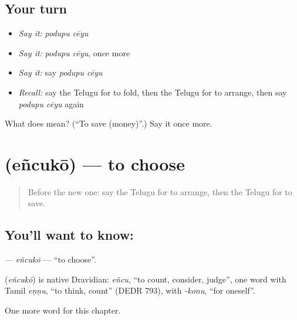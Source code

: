 \subsection*{Your turn}
\begin{itemize}
\raggedright
  \item \emph{Say it:} \emph{podupu cēyu}
  \item \emph{Say it:} \emph{podupu cēyu}, once more
  \item \emph{Say it:} say \emph{podupu cēyu}
  \item \emph{Recall:} say the Telugu for to fold, then the Telugu for to arrange, then say \emph{podupu cēyu} again
\end{itemize}

\begin{tcolorbox}[breakable,colback=teal!4,colframe=teal!35!black,title={Before you move on}]
What does   mean? (\textquotedblleft{}To save (money)\textquotedblright{}.) Say it once more.
\end{tcolorbox}
\section[\texorpdfstring{\te{ఎంచుకో} (eñcukō)}{ఎంచుకో (eñcukō)}]{ (eñcukō) — to choose}

\label{lesson:TE-C200-encuko}



\begin{quote}
Before the new one: say the Telugu for to arrange, then the Telugu for to save.
\end{quote}

\subsection*{You'll want to know: }
\textbf{} — \emph{eñcukō} — \textquotedblleft{}to choose\textquotedblright{}.

\begin{cousinweb}
\textbf{} (\emph{eñcukō}) is native Dravidian: \emph{eñcu}, \textquotedblleft{}to count, consider, judge\textquotedblright{}, one word with Tamil \emph{eṇṇu}, \textquotedblleft{}to think, count\textquotedblright{} (DEDR 793), with \emph{-konu}, \textquotedblleft{}for oneself\textquotedblright{}.
\end{cousinweb}

\begin{grammarlens}[title={What you've built}]
One more word for this chapter.
\end{grammarlens}

